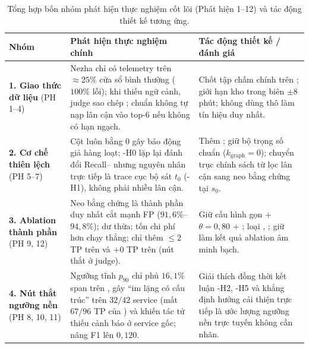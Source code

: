 \begin{table}[H]
  \centering
  \caption[Tổng hợp bốn nhóm phát hiện thực nghiệm cốt lõi]{Tổng hợp bốn nhóm phát hiện thực nghiệm cốt lõi (Phát hiện 1--12) và tác động thiết kế tương ứng.}
  \label{tab:ch5-findings}
  \tblfont
  \tblsetup
  \setlength{\tabcolsep}{4pt}
  \begin{tabularx}{\linewidth}{|>{\raggedright\arraybackslash}p{2.9cm}|Y|>{\raggedright\arraybackslash}p{4.3cm}|}
    \hline
    \textbf{Nhóm} & \textbf{Phát hiện thực nghiệm chính} & \textbf{Tác động thiết kế / đánh giá} \\
    \hline
    \textbf{1. Giao thức dữ liệu} (PH 1--4) & Nezha chỉ có telemetry trên $\approx 25\%$ cửa sổ bình thường ($100\%$ lỗi); khi thiếu ngữ cảnh, judge sao chép ;  chuẩn không tự nạp lân cận vào top-6 nếu không có hạn ngạch. & Chốt tập chấm chính trên ; giới hạn kho trong biên $\pm 8$ phút; không dùng  thô làm tín hiệu duy nhất. \\
    \hline
    \textbf{2. Cơ chế thiên lệch} (PH 5--7) & Cột  luôn bằng $0$ gây báo động giả hàng loạt; \hyp{H0} lặp lại đánh đổi Recall-- nhưng nguyên nhân trực tiếp là trace cục bộ sát $t_0$ (\hyp{H1}), không phải nhiễu lân cận. & Thêm ; giữ bộ trọng số  chuẩn ($k_{\text{graph}} = 0$); chuyển trục chính sách từ lọc lân cận sang neo bằng chứng tại $s_0$. \\
    \hline
    \textbf{3. Ablation thành phần} (PH 9, 12) & Neo bằng chứng  là thành phần duy nhất cắt mạnh FP ($91{,}6\%$--$94{,}8\%$);  dư thừa;  tốn chi phí hơn  chạy thẳng;  chỉ thêm $\le 2$ TP trên  và $+0$ TP trên  (nút thắt ở judge). & Giữ cấu hình gọn  + $\theta = 0{,}80$ + ; loại , ; giữ  làm kết quả ablation âm minh bạch. \\
    \hline
    \textbf{4. Nút thắt ngưỡng nền} (PH 8, 10, 11) & Ngưỡng tĩnh  $p_{90}$ chỉ phủ $16{,}1\%$ span trên , gây ``im lặng có cấu trúc'' trên $32/42$ service (mất $67/96$ TP của ) và khiến tác tử  thiếu cảnh báo ở service gốc;  nâng F1 lên $0{,}120$. & Giải thích đồng thời kết luận \hyp{H2}, \hyp{H5} và khẳng định hướng cải thiện trực tiếp là ước lượng ngưỡng nền trực tuyến không cần nhãn. \\
    \hline
  \end{tabularx}
\end{table}


